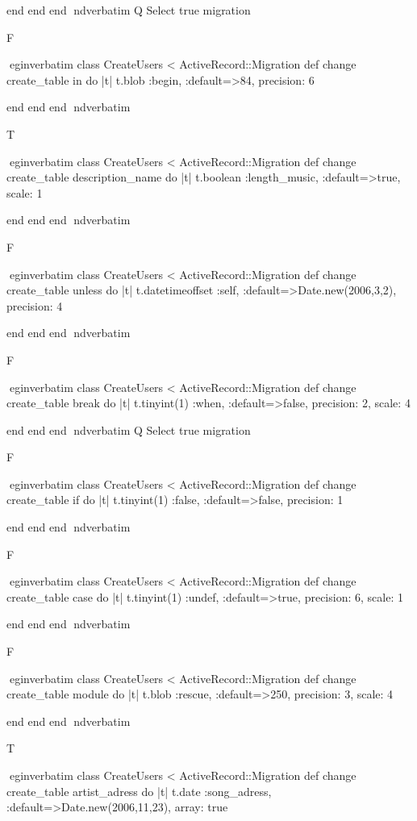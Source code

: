     end 
  end 
end
nd{verbatim}
Q
 Select true migration

F

egin{verbatim}
 class CreateUsers < ActiveRecord::Migration 
  def change 
    create_table in do |t| 
      t.blob :begin, :default=>84, precision: 6
    
    end 
  end 
end
nd{verbatim}

T

egin{verbatim}
 class CreateUsers < ActiveRecord::Migration 
  def change 
    create_table description_name do |t| 
      t.boolean :length_music, :default=>true, scale: 1
    
    end 
  end 
end
nd{verbatim}

F

egin{verbatim}
 class CreateUsers < ActiveRecord::Migration 
  def change 
    create_table unless do |t| 
      t.datetimeoffset :self, :default=>Date.new(2006,3,2), precision: 4
    
    end 
  end 
end
nd{verbatim}

F

egin{verbatim}
 class CreateUsers < ActiveRecord::Migration 
  def change 
    create_table break do |t| 
      t.tinyint(1) :when, :default=>false, precision: 2, scale: 4
    
    end 
  end 
end
nd{verbatim}
Q
 Select true migration

F

egin{verbatim}
 class CreateUsers < ActiveRecord::Migration 
  def change 
    create_table if do |t| 
      t.tinyint(1) :false, :default=>false, precision: 1
    
    end 
  end 
end
nd{verbatim}

F

egin{verbatim}
 class CreateUsers < ActiveRecord::Migration 
  def change 
    create_table case do |t| 
      t.tinyint(1) :undef, :default=>true, precision: 6, scale: 1
    
    end 
  end 
end
nd{verbatim}

F

egin{verbatim}
 class CreateUsers < ActiveRecord::Migration 
  def change 
    create_table module do |t| 
      t.blob :rescue, :default=>250, precision: 3, scale: 4
    
    end 
  end 
end
nd{verbatim}

T

egin{verbatim}
 class CreateUsers < ActiveRecord::Migration 
  def change 
    create_table artist_adress do |t| 
      t.date :song_adress, :default=>Date.new(2006,11,23), array: true
    
